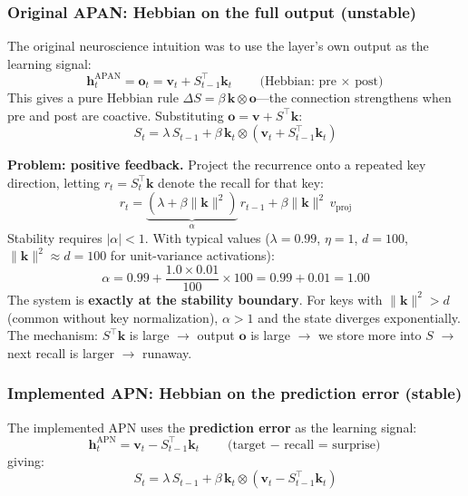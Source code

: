 \documentclass[11pt,a4paper]{article}
\begin{document}
\subsubsection{Original APAN: Hebbian on the full output (unstable)}

The original neuroscience intuition was to use the layer's own output as the learning signal:
\begin{equation}
\mathbf{h}_t^{\text{APAN}} = \mathbf{o}_t = \mathbf{v}_t + S_{t-1}^\top \mathbf{k}_t \qquad \text{(Hebbian: pre $\times$ post)}
\end{equation}
This gives a pure Hebbian rule $\Delta S = \beta \, \mathbf{k} \otimes \mathbf{o}$---the connection strengthens when pre and post are coactive.
Substituting $\mathbf{o} = \mathbf{v} + S^\top \mathbf{k}$:
\begin{equation}
S_t = \lambda \, S_{t-1} + \beta \, \mathbf{k}_t \otimes (\mathbf{v}_t + S_{t-1}^\top \mathbf{k}_t)
\end{equation}

\textbf{Problem: positive feedback.}
Project the recurrence onto a repeated key direction, letting $r_t = S_t^\top \mathbf{k}$ denote the recall for that key:
\begin{equation}
r_t = \underbrace{(\lambda + \beta \|\mathbf{k}\|^2)}_{\alpha} \, r_{t-1} + \beta \|\mathbf{k}\|^2 \, v_{\text{proj}}
\end{equation}
Stability requires $|\alpha| < 1$.
With typical values ($\lambda=0.99$, $\eta=1$, $d=100$, $\|\mathbf{k}\|^2 \approx d = 100$ for unit-variance activations):
\[
\alpha = 0.99 + \frac{1.0 \times 0.01}{100} \times 100 = 0.99 + 0.01 = 1.00
\]
The system is \textbf{exactly at the stability boundary}.
For keys with $\|\mathbf{k}\|^2 > d$ (common without key normalization), $\alpha > 1$ and the state diverges exponentially.
The mechanism: $S^\top \mathbf{k}$ is large $\to$ output $\mathbf{o}$ is large $\to$ we store more into $S$ $\to$ next recall is larger $\to$ runaway.

\subsubsection{Implemented APN: Hebbian on the prediction error (stable)}

The implemented APN uses the \textbf{prediction error} as the learning signal:
\begin{equation}
\mathbf{h}_t^{\text{APN}} = \mathbf{v}_t - S_{t-1}^\top \mathbf{k}_t \qquad \text{(target $-$ recall = surprise)}
\end{equation}
giving:
\begin{equation}\label{eq:apn-implemented}
S_t = \lambda \, S_{t-1} + \beta \, \mathbf{k}_t \otimes (\mathbf{v}_t - S_{t-1}^\top \mathbf{k}_t)
\end{equation}
\end{document}
